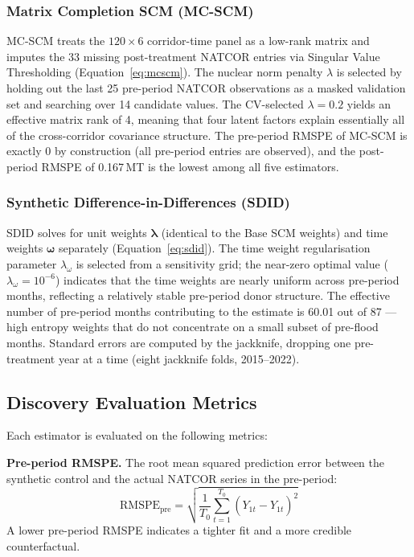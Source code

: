 \subsubsection{Matrix Completion SCM (MC-SCM)}
\label{sec:mcscm_method}

MC-SCM treats the $120 \times 6$ corridor-time panel as a
low-rank matrix and imputes the 33 missing post-treatment NATCOR
entries via Singular Value Thresholding
(Equation~\ref{eq:mcscm}).
The nuclear norm penalty $\lambda$ is selected by holding out the
last 25 pre-period NATCOR observations as a masked validation set
and searching over 14 candidate values.
The CV-selected $\lambda = 0.2$ yields an effective matrix rank of 4,
meaning that four latent factors explain essentially all of the
cross-corridor covariance structure.
The pre-period RMSPE of MC-SCM is exactly 0 by construction (all
pre-period entries are observed), and the post-period RMSPE of
0.167\,MT is the lowest among all five estimators.

\subsubsection{Synthetic Difference-in-Differences (SDID)}
\label{sec:sdid_method}

SDID solves for unit weights $\boldsymbol{\lambda}$ (identical to
the Base SCM weights) and time weights $\boldsymbol{\omega}$
separately (Equation~\ref{eq:sdid}).
The time weight regularisation parameter $\lambda_\omega$ is
selected from a sensitivity grid; the near-zero optimal value
($\lambda_\omega = 10^{-6}$) indicates that the time weights are
nearly uniform across pre-period months, reflecting a relatively
stable pre-period donor structure.
The effective number of pre-period months contributing to the
estimate is 60.01 out of 87 --- high entropy weights that do not
concentrate on a small subset of pre-flood months.
Standard errors are computed by the jackknife, dropping one
pre-treatment year at a time (eight jackknife folds, 2015--2022).

\subsection{Discovery Evaluation Metrics}
\label{sec:metrics}

Each estimator is evaluated on the following metrics:

\textbf{Pre-period RMSPE.}
The root mean squared prediction error between the synthetic control
and the actual NATCOR series in the pre-period:
\begin{equation}
  \text{RMSPE}_{\text{pre}} = \sqrt{\frac{1}{T_0}
    \sum_{t=1}^{T_0}\!\left(Y_{1t} - \hat{Y}_{1t}\right)^2}
\end{equation}
A lower pre-period RMSPE indicates a tighter fit and a more credible
counterfactual.

